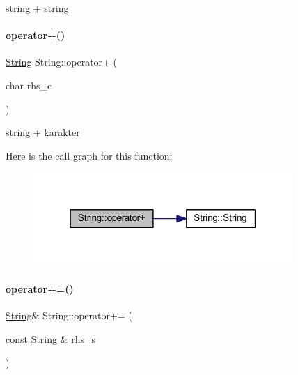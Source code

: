 string + string 

\mbox{\label{class_string_afa169686af6b513e1f059cf2bf39695f}} 
\paragraph{\texorpdfstring{operator+()}{operator+()}\hspace{0.1cm}{\footnotesize\ttfamily [2/2]}}
{\footnotesize\ttfamily \mbox{\hyperlink{class_string}{String}} String\+::operator+ (\begin{DoxyParamCaption}\item[{char}]{rhs\+\_\+c }\end{DoxyParamCaption})\hspace{0.3cm}{\ttfamily [inline]}}



string + karakter 

Here is the call graph for this function\+:
\nopagebreak
\begin{figure}[H]
\begin{center}
\leavevmode
\includegraphics[width=279pt]{class_string_afa169686af6b513e1f059cf2bf39695f_cgraph}
\end{center}
\end{figure}
\mbox{\label{class_string_ac203e7c52e04bb86f62f9dd75527b361}} 
\paragraph{\texorpdfstring{operator+=()}{operator+=()}}
{\footnotesize\ttfamily \mbox{\hyperlink{class_string}{String}}\& String\+::operator+= (\begin{DoxyParamCaption}\item[{const \mbox{\hyperlink{class_string}{String}} \&}]{rhs\+\_\+s }\end{DoxyParamCaption})\hspace{0.3cm}{\ttfamily [inline]}}



